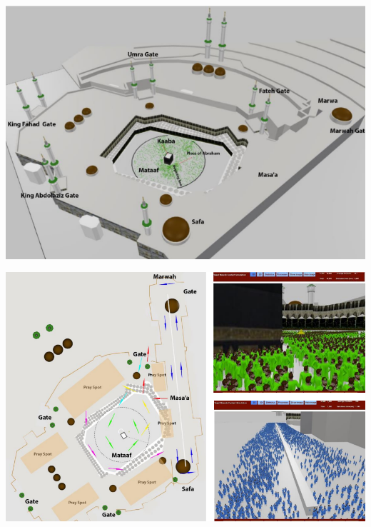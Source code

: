 \documentclass[aspectratio=43]{beamer}
\begin{document}
\begin{frame}
\begin{center}
\includegraphics[width=\textwidth]{FIGS/ABM_Hajj_MAH_3Dmodel.png}
\end{center}
\end{frame}


\begin{frame}
\begin{center}
\includegraphics[width=\textwidth]{FIGS/ABM_Hajj_setup.png}
\end{center}
\end{frame}
\end{document}
